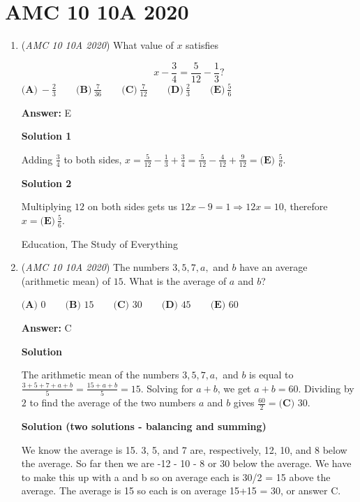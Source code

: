 \section{AMC 10 10A 2020}
        \begin{enumerate}
        	\item (\textit{AMC 10 10A 2020}) What value of $x$ satisfies

 \[x- \frac{3}{4} = \frac{5}{12} - \frac{1}{3}?\]
$\textbf{(A)}\ {-}\frac{2}{3}\qquad\textbf{(B)}\ \frac{7}{36}\qquad\textbf{(C)}\ \frac{7}{12}\qquad\textbf{(D)}\ \frac{2}{3}\qquad\textbf{(E)}\ \frac{5}{6}$

 \textbf{Answer: }E



\textbf{Solution 1}

Adding $\frac{3}{4}$ to both sides, $x= \frac{5}{12} - \frac{1}{3} + \frac{3}{4} = \frac{5}{12} - \frac{4}{12} + \frac{9}{12}=\boxed{\textbf{(E) }\frac{5}{6}}$.

 



\textbf{Solution 2}

Multiplying $12$ on both sides gets us $12x-9=1 \Rightarrow 12x=10$, therefore $x=\boxed{\textbf{(E)}~\frac{5}{6}}$.

 Education, The Study of Everything

 


	\item (\textit{AMC 10 10A 2020}) The numbers $3, 5, 7, a,$ and $b$ have an average (arithmetic mean) of $15$. What is the average of $a$ and $b$?


 $\textbf{(A) } 0 \qquad\textbf{(B) } 15 \qquad\textbf{(C) } 30 \qquad\textbf{(D) } 45 \qquad\textbf{(E) } 60$

 \textbf{Answer: }C



\textbf{Solution}

The arithmetic mean of the numbers $3, 5, 7, a,$ and $b$ is equal to $\frac{3+5+7+a+b}{5}=\frac{15+a+b}{5}=15$. Solving for $a+b$, we get $a+b=60$. Dividing by $2$ to find the average of the two numbers $a$ and $b$ gives $\frac{60}{2}=\boxed{\textbf{(C) }30}$.

 



\textbf{Solution (two solutions - balancing and summing)}

We know the average is 15. 3, 5, and 7 are, respectively, 12, 10, and 8 below the average. So far then we are -12 - 10 - 8 or 30 below the average. We have to make this up with a and b so on average each is 30/2 = 15 above the average. The average is 15 so each is on average 15+15 = 30, or answer C.


\end{enumerate}
